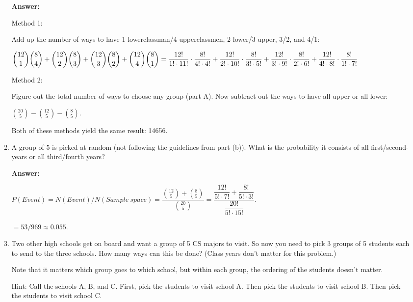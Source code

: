\documentclass[11pt, letterpaper]{report}
\begin{document}
\begin{enumerate}
\begin{enumerate}
\textbf{Answer:}
        
        Method 1:
        
        Add up the number of ways to have 1 lowerclassman/4 upperclassmen, 2 lower/3 upper, 3/2,
        and 4/1:
        
        $\displaystyle \binom{12}{1}\binom{8}{4}
        +\binom{12}{2}\binom{8}{3} 
        +\binom{12}{3}\binom{8}{2}
        +\binom{12}{4}\binom{8}{1} \\= 
        \frac{12!}{1! \cdot 11!}\cdot\frac{8!}{4! \cdot 4!}+
        \frac{12!}{2! \cdot 10!}\cdot\frac{8!}{3! \cdot 5!}+
        \frac{12!}{3! \cdot 9!}\cdot\frac{8!}{2! \cdot 6!}+
        \frac{12!}{4! \cdot 8!}\cdot\frac{8!}{1! \cdot 7!}$
        
        Method 2:
        
        Figure out the total number of ways to choose any group (part A).  Now subtract
        out the ways to have all upper or all lower:
        
        $\displaystyle \binom{20}{5} - \binom{12}{5} - \binom{8}{5}$.
        
        Both of these methods yield the same result: 14656.
        
        \item A group of 5 is picked at random (not following the guidelines from part (b)).  What is the probability it consists of all first/second-years or all third/fourth years?
 
 
  \textbf{Answer:}
        
        $\displaystyle P(Event) = N(Event)/N(Sample\ space) = \dfrac{\displaystyle \binom{12}{5} + \binom{8}{5}}{\displaystyle \binom{20}{5}}
        = \dfrac{\dfrac{12!}{5! \cdot 7!} + \dfrac{8!}{5! \cdot 3!}}{\dfrac{20!}{5! \cdot 15!}}$.
        
        $=53/969 \approx 0.055$.
 



        \item Two other high schools get on board and want a group of 5 CS majors to visit.
        So now you need to pick 3 groups of 5 students each to send to the three schools.  How many ways can this be done?  (Class years don't matter for this problem.)
        
   

        Note that it matters which group goes to which school, but within each group, the ordering
        of the students doesn't matter. 
        
        Hint: Call the schools A, B, and C.  First, pick the students to visit school A.
        Then pick the students to visit school B.  Then pick the students to visit school C.
        

\end{enumerate}
\end{enumerate}
\end{document}
